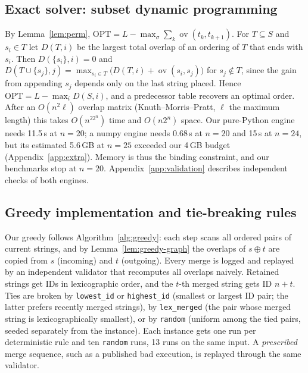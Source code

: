 \documentclass[11pt,a4paper]{article}   %
\theoremstyle{compact}
\theoremstyle{compactdef}
\newcommand{\OPT}{\mathrm{OPT}}
\newcommand{\ov}{\operatorname{ov}}         %
\begin{document}
\subsection{Exact solver: subset dynamic programming}
By Lemma~\ref{lem:perm}, $\OPT=L-\max_\sigma\sum_k\ov(t_k,t_{k+1})$. For
$T\subseteq S$ and $s_i\in T$ let $D(T,i)$ be the largest total overlap of
an ordering of $T$ that ends with $s_i$. Then $D(\{s_i\},i)=0$ and
$D(T\cup\{s_j\},j)=\max_{s_i\in T}\bigl(D(T,i)+\ov(s_i,s_j)\bigr)$ for
$s_j\notin T$, since the gain from appending $s_j$ depends only on the last
string placed. Hence $\OPT=L-\max_iD(S,i)$, and a predecessor table recovers
an optimal order. After an $O(n^2\ell)$ overlap matrix (Knuth--Morris--Pratt,
$\ell$ the maximum length) this takes $O(n^22^n)$ time and $O(n2^n)$ space.
Our pure-Python engine needs 11.5\,s at $n=20$; a numpy engine needs 0.68\,s
at $n=20$ and 15\,s at $n=24$, but its estimated 5.6\,GB at $n=25$ exceeded
our 4\,GB budget (Appendix~\ref{app:extra}). Memory is thus the binding
constraint, and our benchmarks stop at $n=20$. Appendix~\ref{app:validation}
describes independent checks of both engines.

\subsection{Greedy implementation and tie-breaking rules}
Our greedy follows Algorithm~\ref{alg:greedy}: each step scans all ordered
pairs of current strings, and by Lemma~\ref{lem:greedy-graph} the overlaps
of $s\oplus t$ are copied from $s$ (incoming) and $t$ (outgoing). Every
merge is logged and replayed by an independent validator that recomputes
all overlaps naively. Retained strings get IDs in lexicographic order, and
the $t$-th merged string gets ID $n+t$. Ties are broken by
\texttt{lowest\_id} or \texttt{highest\_id} (smallest or largest ID pair; the
latter prefers recently merged strings), by \texttt{lex\_merged} (the pair
whose merged string is lexicographically smallest), or by \texttt{random}
(uniform among the tied pairs, seeded separately from the instance). Each
instance gets one run per deterministic rule and ten \texttt{random} runs,
13 runs on the same input. A \emph{prescribed} merge sequence, such as a
published bad execution, is replayed through the same validator.
\end{document}

